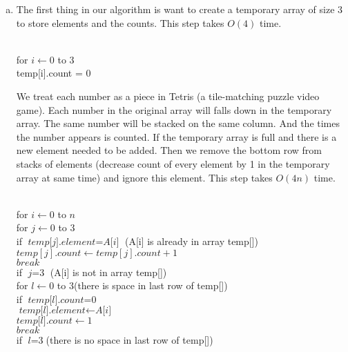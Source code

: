 \documentclass[11pt]{article}
\begin{document}
\begin{solution}
	\mbox{}
\begin{enumerate}[(a)]
\item
The first thing in our algorithm is want to create a temporary array of size 3 to store elements and the counts. This step takes $O(4)$ time.\\
\begin{center}
	\begin{algorithm}		
		\+
		\\ for $\textit{i} \gets 0$ to $3$\+
		\\ temp[i].count = $0$
	\end{algorithm}
\end{center}
We treat each number as a piece in Tetris (a tile-matching puzzle video game). Each number in the original array will falls down in the temporary array. The same number will be stacked on the same column. And the times the number appears is counted. If the temporary array is full and there is a new element needed to be added. Then we remove the bottom row from stacks of elements (decrease count of every element by 1 in the temporary array at same time) and ignore this element. This step takes $O(4n)$ time.\\ 
\begin{center}
	\begin{algorithm}			
		\+
		\\ for $\textit{i} \gets 0$ to $n$\+
		\\ for $\textit{j} \gets 0$ to $3$\+
		\\ if $\textit{temp[j].element} = \textit{A[i]}$ (A[i] is already in array temp[])\+
		\\  	$\textit{temp}[j].count \gets \textit{temp}[j].count + 1 $
		\\		$\textit{break}$\-\-
		\\ if $\textit{j} = \textit{3}$ (A[i] is not in array temp[])\+
		\\ for $\textit{l} \gets 0$ to $3$(there is space in last row of temp[])\+
		\\ if $\textit{temp[l].count} = \textit{0}$\+
		\\ $\textit{temp[l].element} \gets \textit{A[i]}$
		\\ $\textit{temp[l].count} \gets 1$
		\\ $\textit{break}$\-\-
		\\ if $\textit{l} = \textit{3}$(there is no space in last row of temp[])\+

\end{algorithm}
\end{center}
\end{enumerate}
\end{solution}
\end{document}
